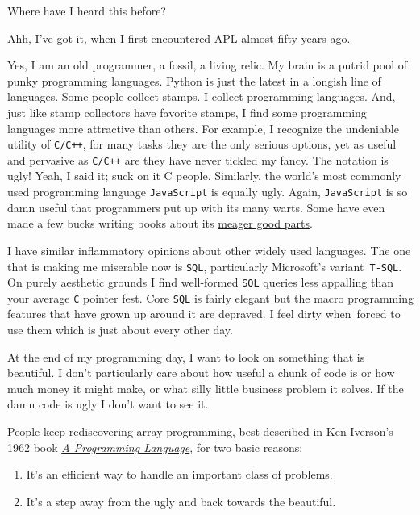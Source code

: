 Where have I heard this before?

Ahh, I've got it, when I first encountered APL almost fifty years ago.

Yes, I am an old programmer, a fossil, a living relic. My brain is a
putrid pool of punky programming languages. Python is just the latest in
a longish line of languages. Some people collect stamps. I collect
programming languages. And, just like stamp collectors have favorite
stamps, I find some programming languages more attractive than others.
For example, I recognize the undeniable utility of \texttt{C/C++}, for
many tasks they are the only serious options, yet as useful and
pervasive as \texttt{C/C++} are they have never tickled my fancy. The
notation is ugly! Yeah, I said it; suck on it C people. Similarly, the
world's most commonly used programming language \texttt{JavaScript} is
equally ugly. Again, \texttt{JavaScript} is so damn useful that
programmers put up with its many warts. Some have even made a few bucks
writing books about its
\href{http://shop.oreilly.com/product/9780596517748.do}{meager good
parts}.

I have similar inflammatory opinions about other widely used languages.
The one that is making me miserable now is \texttt{SQL}, particularly
Microsoft's variant~\texttt{T-SQL}. On purely aesthetic grounds I find
well-formed \texttt{SQL} queries less appalling than your average
\texttt{C} pointer fest. Core \texttt{SQL} is fairly elegant but the
macro programming features that have grown up around it are depraved. I
feel dirty when~forced to use them which is just about every other day.

At the end of my programming day, I want to look on something that is
beautiful. I don't particularly care about how useful a chunk of code is
or how much money it might make, or what silly little business problem
it solves. If the damn code is ugly I don't want to see it.

People keep rediscovering array programming, best described in Ken
Iverson's 1962 book
\href{http://www.jsoftware.com/papers/APL.htm}{\emph{A Programming
Language}}, for two basic reasons:

\begin{enumerate}
\itemsep1pt\parskip0pt
\def\labelenumi{\arabic{enumi}.}
\item
  It's an efficient way to handle an important class of problems.
\item
  It's a step away from the ugly and back towards the beautiful.
\end{enumerate}

